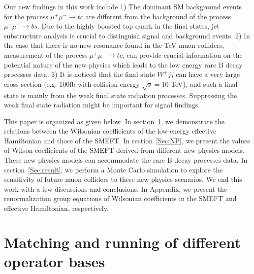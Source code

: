 \documentclass[a4paper,11pt]{article}
\begin{document}
Our new findings in this work include 
1) The dominant SM background events for the process $\mu^+\mu^-\to tc$ are different from the background of the process $\mu^+\mu^-\to bs$. 
Due to the highly boosted top quark in the final states, jet substructure analysis is crucial to distinguish signal and background events. 
2) In the case that there is no new resonance found in the TeV muon colliders, measurement of the process $\mu^+\mu^-\to tc$, 
can provide crucial information on the potential nature of the new physics which leads to the low energy rare B decay processes data. 
3) It is noticed that the final state $W^\pm jj $ can have a very large cross section (e,g. 100fb with collision energy $\sqrt{s}=10$ TeV), 
and such a final state is mainly from the weak final state radiation processes. 
Suppressing the weak final state radiation might be important for signal findings.

This paper is organized as given below. 
In section~\ref{Sec:EFT}, we demonstrate the relations between the Wilsonian coefficients of the low-energy effective Hamiltonian and those of the SMEFT. 
In section~\ref{Sec:NP}, we present the values of Wilson coefficients of the SMEFT derived from different new physics models. 
These new physics models can accommodate the rare B decay processes data. 
In section~\ref{Sec:result}, we perform a Monte Carlo simulation to explore the sensitivity of future muon colliders to these new physics scenarios. 
We end this work with a few discussions and conclusions. 
In Appendix, we present the renormalization group equations of Wilsonian coefficients in the SMEFT and effective Hamiltonian, respectively. 

\section{Matching and running of different operator bases}
\label{Sec:EFT}
\end{document}
